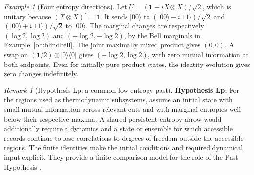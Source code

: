 \documentclass[aps,pra,onecolumn,superscriptaddress,nofootinbib,10pt]{revtex4-2}
\theoremstyle{definition}
\theoremstyle{remark}
\newtheorem{remark}[theorem]{Remark}
\newtheorem{example}[theorem]{Example}
\begin{document}
\begin{example}[Four entropy directions]\label{ob:arrowexamples}
Let \(U=(\mathbf1-iX\otimes X)/\sqrt2\), which is unitary because
\((X\otimes X)^2=\mathbf1\).
It sends \(|00\rangle\) to \((|00\rangle-i|11\rangle)/\sqrt2\)
and \((|00\rangle+i|11\rangle)/\sqrt2\) to \(|00\rangle\).
The marginal changes are respectively \((\log2,\log2)\) and
\((-\log2,-\log2)\), by the Bell marginals in Example~\ref{ob:blindbell}.
The joint maximally mixed product gives \((0,0)\).
A swap on \((\mathbf1/2)\otimes|0\rangle\langle0|\) gives
\((-\log2,\log2)\), with zero mutual information at both endpoints.
Even for initially pure product states, the identity evolution gives
zero changes indefinitely.
\end{example}

\begin{remark}[Hypothesis Lp: a common low-entropy past]\label{ob:past}
\textbf{Hypothesis Lp.}\label{hyp:Lp}  For the regions used as thermodynamic subsystems, assume an initial
state with small mutual information across relevant cuts and with
marginal entropies well below their respective maxima. A shared
persistent entropy arrow would additionally require a dynamics and
a state or ensemble for which accessible records continue to lose
correlations to degrees of freedom outside the accessible regions.
The finite identities make the initial conditions and required dynamical
input explicit. They provide a finite comparison model for the role
of the Past Hypothesis \cite{obr:albert,obr:penrose}.
\end{remark}
\end{document}
